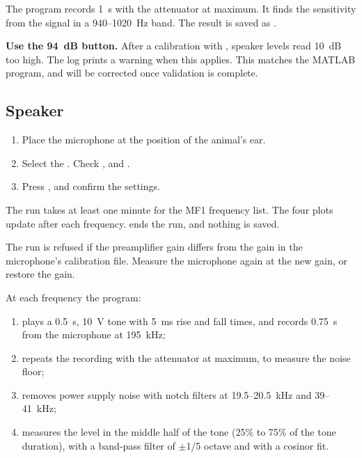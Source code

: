 The program records 1~s with the attenuator at maximum. It finds the sensitivity from
the signal in a 940--1020~Hz band. The result is saved as
.

\begin{caution}
\textbf{Use the 94~dB button.} After a calibration with
, speaker levels read 10~dB too high. The log prints a warning
when this applies. This matches the MATLAB program, and will be corrected once
validation is complete.
\end{caution}


\subsection{Speaker}


\begin{enumerate}
  \item Place the microphone at the position of the animal's ear.
  \item Select the . Check ,
         and .
  \item Press , and confirm the settings.
\end{enumerate}

The run takes at least one minute for the MF1 frequency list. The four plots update
after each frequency.  ends the run, and nothing is saved.

The run is refused if the preamplifier gain differs from the gain in the microphone's
calibration file. Measure the microphone again at the new gain, or restore the gain.

At each frequency the program:

\begin{enumerate}
  \item plays a 0.5~s, 10~V tone with 5~ms rise and fall times, and records 0.75~s from
        the microphone at 195~kHz;
  \item repeats the recording with the attenuator at maximum, to measure the noise
        floor;
  \item removes power supply noise with notch filters at 19.5--20.5~kHz and
        39--41~kHz;
  \item measures the level in the middle half of the tone (25\% to 75\% of the tone
        duration), with a band-pass filter of $\pm$1/5 octave and with a cosinor fit.
\end{enumerate}

